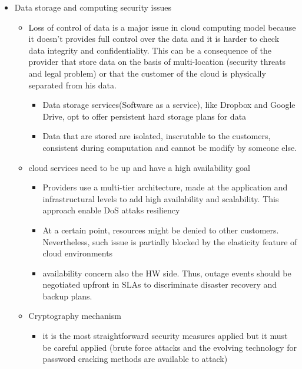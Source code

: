 \documentclass{article}
\begin{document}
\begin{itemize}
\begin{figure}[h]
    \end{figure}
    \begin{itemize}
        \item Data storage and computing security issues
        \begin{itemize}
            \item Loss of control of data is a major issue in cloud computing model because it doesn't provides full control over the data and it is harder to check data integrity and confidentiality. This can be a consequence of the provider that store data on the basis of multi-location (security threats and legal problem) or that the customer of the cloud is physically separated from his data.
            \begin{itemize}
                \item Data storage services(Software as a service), like Dropbox and Google Drive, opt to offer persistent hard storage plans for data
                \item Data that are stored are isolated, inscrutable to the customers, consistent during computation and cannot be modify by someone else.
            \end{itemize}
            \item cloud services need to be up and have a high availability goal
            \begin{itemize}
                \item Providers use a multi-tier architecture, made at the application and infrastructural levels to add high availability and scalability. This approach enable DoS attaks resiliency
                \item At a certain point, resources might be denied to other customers. Nevertheless, such issue is partially blocked by the elasticity feature of cloud environments
                \item availability concern also the HW side. Thus, outage events should be negotiated upfront in SLAs to discriminate disaster recovery and backup plans.
            \end{itemize}
            \item Cryptography mechanism 
            \begin{itemize}
                \item it is the most straightforward security measures applied but it must be careful applied (brute force attacks and the evolving technology for password cracking methods are available to attack)

\end{itemize}
\end{itemize}
\end{itemize}
\end{itemize}
\end{document}
